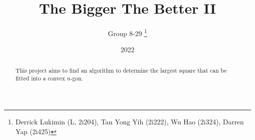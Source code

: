 \documentclass[11pt]{article}
\title{The Bigger The Better II}
\author{Group 8-29 \thanks{Derrick Lukimin (L, 2i204), Tan Yong Yih (2i222), Wu Hao (2i324), Darren Yap (2i425)}}
\date{2022}
\begin{document}
\onehalfspacing
\maketitle
\tableofcontents

\begin{abstract}
  This project aims to find an algorithm to determine
  the largest square that can be fitted into a convex
  $n$-gon.
\end{abstract}
\end{document}
